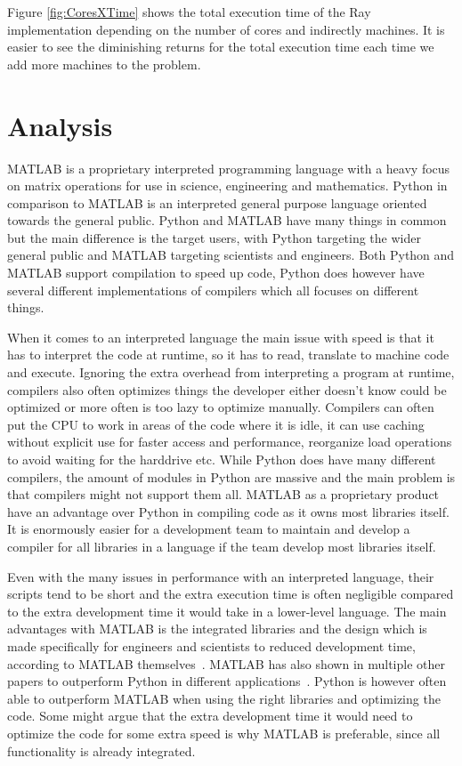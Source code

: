 \documentclass[12pt, a4paper]{article}
\begin{document}
Figure \ref{fig:CoresXTime} shows the total execution time of the Ray implementation depending on the number of cores and indirectly machines.
It is easier to see the diminishing returns for the total execution time each time we add more machines to the problem.


\section{Analysis}

MATLAB is a proprietary interpreted programming language with a heavy focus on matrix operations for use in science, engineering and mathematics.
Python in comparison to MATLAB is an interpreted general purpose language oriented towards the general public.
Python and MATLAB have many things in common but the main difference is the target users, with Python targeting the wider general public and MATLAB targeting scientists and engineers.
Both Python and MATLAB support compilation to speed up code, Python does however have several different implementations of compilers which all focuses on different things.

When it comes to an interpreted language the main issue with speed is that it has to interpret the code at runtime, so it has to read, translate to machine code and execute.
Ignoring the extra overhead from interpreting a program at runtime, compilers also often optimizes things the developer either doesn't know could be optimized or more often is too lazy to optimize manually.
Compilers can often put the CPU to work in areas of the code where it is idle, it can use caching without explicit use for faster access and performance, reorganize load operations to avoid waiting for the harddrive etc. 
While Python does have many different compilers, the amount of modules in Python are massive and the main problem is that compilers might not support them all.
MATLAB as a proprietary product have an advantage over Python in compiling code as it owns most libraries itself.
It is enormously easier for a development team to maintain and develop a compiler for all libraries in a language if the team develop most libraries itself. 

Even with the many issues in performance with an interpreted language, their scripts tend to be short and the extra execution time is often negligible compared to the extra development time it would take in a lower-level language.
The main advantages with MATLAB is the integrated libraries and the design  which is made specifically for engineers and scientists to reduced development time, according to MATLAB themselves~\cite{WhyMatlab}. 
MATLAB has also shown in multiple other papers to outperform Python in different applications~\cite{EMMatVsPy, ARUOBA2015265}.
Python is however often able to outperform MATLAB when using the right libraries and optimizing the code.
Some might argue that the extra development time it would need to optimize the code for some extra speed is why MATLAB is preferable, since all functionality is already integrated.
\end{document}

